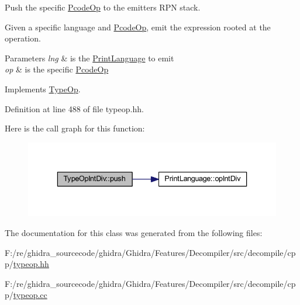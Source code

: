 Push the specific \mbox{\hyperlink{class_pcode_op}{Pcode\+Op}} to the emitter\textquotesingle{}s R\+PN stack. 

Given a specific language and \mbox{\hyperlink{class_pcode_op}{Pcode\+Op}}, emit the expression rooted at the operation. 
\begin{DoxyParams}{Parameters}
{\em lng} & is the \mbox{\hyperlink{class_print_language}{Print\+Language}} to emit \\
\hline
{\em op} & is the specific \mbox{\hyperlink{class_pcode_op}{Pcode\+Op}} \\
\hline
\end{DoxyParams}


Implements \mbox{\hyperlink{class_type_op_ac9c9544203ed74dabe6ac662b653b2af}{Type\+Op}}.



Definition at line 488 of file typeop.\+hh.

Here is the call graph for this function\+:
\nopagebreak
\begin{figure}[H]
\begin{center}
\leavevmode
\includegraphics[width=336pt]{class_type_op_int_div_a8fee65ef2ac0fcc8373355a597459fcb_cgraph}
\end{center}
\end{figure}


The documentation for this class was generated from the following files\+:\begin{DoxyCompactItemize}
\item 
F\+:/re/ghidra\+\_\+sourcecode/ghidra/\+Ghidra/\+Features/\+Decompiler/src/decompile/cpp/\mbox{\hyperlink{typeop_8hh}{typeop.\+hh}}\item 
F\+:/re/ghidra\+\_\+sourcecode/ghidra/\+Ghidra/\+Features/\+Decompiler/src/decompile/cpp/\mbox{\hyperlink{typeop_8cc}{typeop.\+cc}}\end{DoxyCompactItemize}
